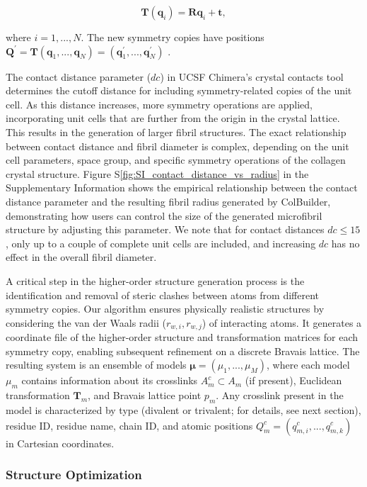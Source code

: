 \documentclass[10pt,letterpaper]{article}
\begin{document}
\begin{equation}
    \bm{T}(\bm{q}_i)=\bm{R}\bm{q}_i + \bm{t},
    \label{eq:rigid_tranform}
\end{equation}
 
where \(i=1,...,N\). The new symmetry copies have positions \(\bm{Q}^\prime=\bm{T}(\bm{q}_1,...,\bm{q}_N)=\left(\bm{q}^\prime_1,...,\bm{q}^\prime_N\right)\) \cite{bennet2010xray}. 

The contact distance parameter (\(dc\)) in UCSF Chimera's crystal contacts tool determines the cutoff distance for including symmetry-related copies of the unit cell. As this distance increases, more symmetry operations are applied, incorporating unit cells that are further from the origin in the crystal lattice. This results in the generation of larger fibril structures. The exact relationship between contact distance and fibril diameter is complex, depending on the unit cell parameters, space group, and specific symmetry operations of the collagen crystal structure. Figure S\ref{fig:SI_contact_distance_vs_radius} in the Supplementary Information shows the empirical relationship between the contact distance parameter and the resulting fibril radius generated by ColBuilder, demonstrating how users can control the size of the generated microfibril structure by adjusting this parameter. We note that for contact distances \(dc \leq 15\), only up to a couple of complete unit cells are included, and increasing \(dc\) has no effect in the overall fibril diameter.

A critical step in the higher-order structure generation process is the identification and removal of steric clashes between atoms from different symmetry copies. Our algorithm ensures physically realistic structures by considering the van der Waals radii (\(r_{w,i}, r_{w,j}\)) of interacting atoms. It generates a coordinate file of the higher-order structure and transformation matrices for each symmetry copy, enabling subsequent refinement on a discrete Bravais lattice. The resulting system is an ensemble of models \(\bm{\mu}=(\mu_1,...,\mu_M)\), where each model \(\mu_m\) contains information about its crosslinks \(A^c_m \subset A_m\) (if present), Euclidean transformation \(\bm{T}_m\), and Bravais lattice point \(p_m\). Any crosslink present in the model is characterized by type (divalent or trivalent; for details, see next section), residue ID, residue name, chain ID, and atomic positions \(Q^c_m=(q^c_{m,i},...,q^c_{m,k})\) in Cartesian coordinates.

\subsubsection*{Structure Optimization}\label{subsubsec1}
\end{document}
